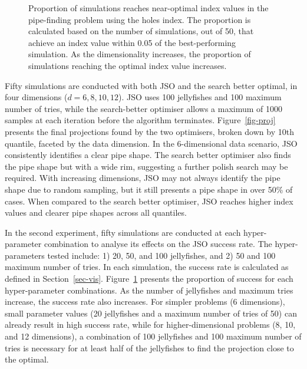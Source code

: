 \documentclass[
  number,
  preprint,
  3p]{elsarticle}
\begin{document}
\begin{figure}


\caption{\label{fig-proportion}Proportion of simulations reaches
near-optimal index values in the pipe-finding problem using the holes
index. The proportion is calculated based on the number of simulations,
out of 50, that achieve an index value within 0.05 of the
best-performing simulation. As the dimensionality increases, the
proportion of simulations reaching the optimal index value increases.}

\end{figure}%

Fifty simulations are conducted with both JSO and the search better
optimal, in four dimensions (\(d = 6, 8, 10, 12\)). JSO uses 100
jellyfishes and 100 maximum number of tries, while the search-better
optimiser allows a maximum of 1000 samples at each iteration before the
algorithm terminates. Figure~\ref{fig-proj} presents the final
projections found by the two optimisers, broken down by 10th quantile,
faceted by the data dimension. In the 6-dimensional data scenario, JSO
consistently identifies a clear pipe shape. The search better optimiser
also finds the pipe shape but with a wide rim, suggesting a further
polish search may be required. With increasing dimensions, JSO may not
always identify the pipe shape due to random sampling, but it still
presents a pipe shape in over 50\% of cases. When compared to the search
better optimiser, JSO reaches higher index values and clearer pipe
shapes across all quantiles.

In the second experiment, fifty simulations are conducted at each
hyper-parameter combination to analyse its effects on the JSO success
rate. The hyper-parameters tested include: 1) 20, 50, and 100
jellyfishes, and 2) 50 and 100 maximum number of tries. In each
simulation, the success rate is calculated as defined in
Section~\ref{sec-vis}. Figure~\ref{fig-proportion} presents the
proportion of success for each hyper-parameter combinations. As the
number of jellyfishes and maximum tries increase, the success rate also
increases. For simpler problems (6 dimensions), small parameter values
(20 jellyfishes and a maximum number of tries of 50) can already result
in high success rate, while for higher-dimensional problems (8, 10, and
12 dimensions), a combination of 100 jellyfishes and 100 maximum number
of tries is necessary for at least half of the jellyfishes to find the
projection close to the optimal.
\end{document}
